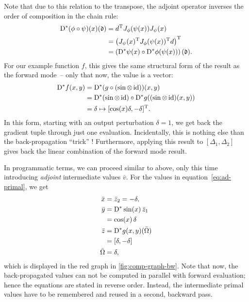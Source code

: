 Note that due to this relation to the transpose, the adjoint operator inverses the order of
composition in the chain rule:
\begin{equation}
  \begin{aligned}
    \mathop{}\!\mathrm{D}^{*} (\phi \circ \psi)(x)(\mathfrak{d}) &= d^{\mathrm{T}} J_{\phi}(\psi(x)) J_{\psi}(x) \\
    &=  \left( J_{\psi}(x)^{\mathrm{T}} J_{\phi}(\psi(x))^{\mathrm{T}} d \right)^{\mathrm{T}} \\
    &= \left( \mathop{}\!\mathrm{D}^{*}\psi(x) \circ \mathop{}\!\mathrm{D}^{*}\phi(\psi(x)) \right)(\mathfrak{d}).
  \end{aligned}
\end{equation}
For our example function \(f\), this gives the same structural form of the result as the forward
mode~-- only that now, the value is a vector:
\begin{equation}
  \begin{aligned}
    \mathop{}\!\mathrm{D}^{*} f(x, y) &= \mathop{}\!\mathrm{D}^{*} (g \circ (\sin \otimes \operatorname{id}))(x, y) \\
    &= \mathop{}\!\mathrm{D}^{*}(\sin \otimes \operatorname{id}) \circ \mathop{}\!\mathrm{D}^{*} g((\sin \otimes \operatorname{id})(x, y)) \\
    &= \delta \mapsto [\cos(x)\delta, -\delta]^{\mathrm{T}}.
  \end{aligned}
\end{equation}
In this form, starting with an output perturbation \(\delta = 1\), we get back the gradient tuple
through just one evaluation.  Incidentally, this is nothing else than the back-propagation
\enquote{trick} \parencite{bishop2006pattern}!  Furthermore, applying this result to
\([\Delta_1, \Delta_2]\) gives back the linear combination of the forward mode result.

In programmatic terms, we can proceed similar to above, only this time introducing \emph{adjoint}
intermediate values \(\bar{v}\).  For the values in equation~\eqref{eq:ad-primal}, we get
\begin{equation}
  \label{eq:ad-backward}
  \begin{aligned}
    \bar{x} &= \bar{z}_2 = -\delta, \\
    \bar{y} &= \mathop{}\!\mathrm{D}^{*}\sin(x) \, \bar{z}_1 \\
    &= \cos(x) \, \delta\\
    \bar{z} &= \mathop{}\!\mathrm{D}^{*} g(x, y)(\bar{\Omega}) \\
    &= [\delta, -\delta] \\
    \bar{\Omega} &= \delta,
  \end{aligned}
\end{equation}
which is displayed in the red graph in \ref{fig:comp-graph-bw}.  Note that now, the back-propagated
values can not be computed in parallel with forward evaluation; hence the equations are stated in
reverse order.  Instead, the intermediate primal values have to be remembered and reused in a
second, backward pass.

